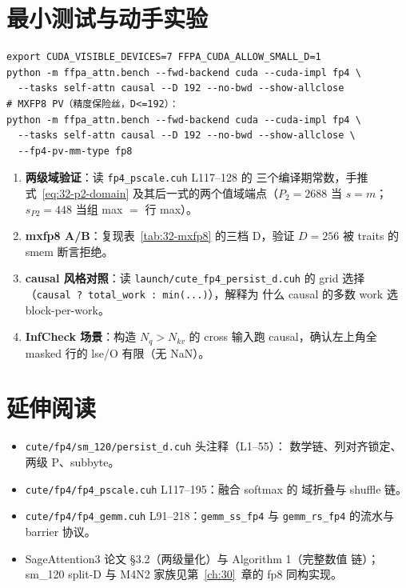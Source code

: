 \section{最小测试与动手实验}

\begin{lstlisting}[style=console]
export CUDA_VISIBLE_DEVICES=7 FFPA_CUDA_ALLOW_SMALL_D=1
python -m ffpa_attn.bench --fwd-backend cuda --cuda-impl fp4 \
  --tasks self-attn causal --D 192 --no-bwd --show-allclose
# MXFP8 PV（精度保险丝，D<=192）：
python -m ffpa_attn.bench --fwd-backend cuda --cuda-impl fp4 \
  --tasks self-attn causal --D 192 --no-bwd --show-allclose \
  --fp4-pv-mm-type fp8
\end{lstlisting}

\begin{enumerate}[itemsep=2pt,topsep=2pt]
  \item \textbf{两级域验证}：读 \texttt{fp4\_pscale.cuh} L117--128 的
        三个编译期常数，手推
        式~\ref{eq:32-p2-domain} 及其后一式的两个值域端点（$P_2=2688$ 当
        $s=m$；$s_{P2}=448$ 当组 max $=$ 行 max）。
  \item \textbf{mxfp8 A/B}：复现表~\ref{tab:32-mxfp8} 的三档 D，验证
        $D{=}256$ 被 traits 的 smem 断言拒绝。
  \item \textbf{causal 风格对照}：读 \texttt{launch/cute\_fp4\_persist\_d.cuh} 的
        grid 选择（\texttt{causal ? total\_work : min(...)}），解释为
        什么 causal 的多数 work 选 block-per-work。
  \item \textbf{InfCheck 场景}：构造 $N_q>N_{kv}$ 的 cross 输入跑
        causal，确认左上角全 masked 行的 lse/O 有限（无 NaN）。
\end{enumerate}

\section*{延伸阅读}

\begin{itemize}[itemsep=0pt,topsep=2pt]
  \item \texttt{cute/fp4/sm\_120/persist\_d.cuh} 头注释（L1--55）：
        数学链、列对齐锁定、两级 P、subbyte。
  \item \texttt{cute/fp4/fp4\_pscale.cuh} L117--195：融合 softmax 的
        域折叠与 shuffle 链。
  \item \texttt{cute/fp4/fp4\_gemm.cuh} L91--218：\texttt{gemm\_ss\_fp4}
        与 \texttt{gemm\_rs\_fp4} 的流水与 barrier 协议。
  \item SageAttention3 论文 §3.2（两级量化）与 Algorithm 1（完整数值
        链）；sm\_120 split-D 与 M4N2 家族见第~\ref{ch:30}~章的 fp8
        同构实现。
\end{itemize}
